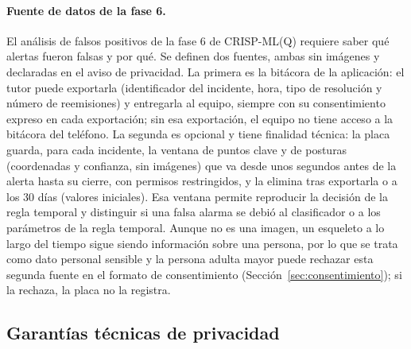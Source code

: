 \documentclass[12pt,a4paper,oneside]{book}
\theoremstyle{plain}
\theoremstyle{definition}
\theoremstyle{remark}
\begin{document}
\paragraph{Fuente de datos de la fase 6.}\label{sec:fuente-fase6} El análisis de falsos positivos de la fase 6 de CRISP-ML(Q) requiere saber qué alertas fueron falsas y por qué. Se definen dos fuentes, ambas sin imágenes y declaradas en el aviso de privacidad. La primera es la bitácora de la aplicación: el tutor puede exportarla (identificador del incidente, hora, tipo de resolución y número de reemisiones) y entregarla al equipo, siempre con su consentimiento expreso en cada exportación; sin esa exportación, el equipo no tiene acceso a la bitácora del teléfono. La segunda es opcional y tiene finalidad técnica: la placa guarda, para cada incidente, la ventana de puntos clave y de posturas (coordenadas y confianza, sin imágenes) que va desde unos segundos antes de la alerta hasta su cierre, con permisos restringidos, y la elimina tras exportarla o a los 30 días (valores iniciales). Esa ventana permite reproducir la decisión de la regla temporal y distinguir si una falsa alarma se debió al clasificador o a los parámetros de la regla temporal. Aunque no es una imagen, un esqueleto a lo largo del tiempo sigue siendo información sobre una persona, por lo que se trata como dato personal sensible y la persona adulta mayor puede rechazar esta segunda fuente en el formato de consentimiento (Sección~\ref{sec:consentimiento}); si la rechaza, la placa no la registra.

\subsection{Garantías técnicas de privacidad}
\end{document}
